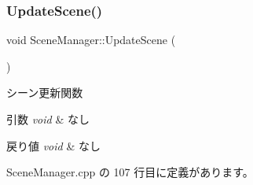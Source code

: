 \subsubsection{\texorpdfstring{Update\+Scene()}{UpdateScene()}}
{\footnotesize\ttfamily void Scene\+Manager\+::\+Update\+Scene (\begin{DoxyParamCaption}{ }\end{DoxyParamCaption})}



シーン更新関数 


\begin{DoxyParams}{引数}
{\em void} & なし \\
\hline
\end{DoxyParams}

\begin{DoxyRetVals}{戻り値}
{\em void} & なし \\
\hline
\end{DoxyRetVals}


 Scene\+Manager.\+cpp の 107 行目に定義があります。

